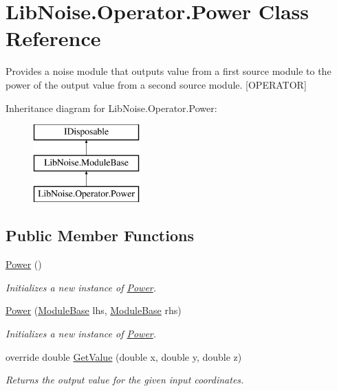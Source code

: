 \hypertarget{class_lib_noise_1_1_operator_1_1_power}{}\section{Lib\+Noise.\+Operator.\+Power Class Reference}
\label{class_lib_noise_1_1_operator_1_1_power}


Provides a noise module that outputs value from a first source module to the power of the output value from a second source module. \mbox{[}O\+P\+E\+R\+A\+T\+OR\mbox{]}  


Inheritance diagram for Lib\+Noise.\+Operator.\+Power\+:\begin{figure}[H]
\begin{center}
\leavevmode
\includegraphics[height=3.000000cm]{class_lib_noise_1_1_operator_1_1_power}
\end{center}
\end{figure}
\subsection*{Public Member Functions}
\begin{DoxyCompactItemize}
\item 
\hyperlink{class_lib_noise_1_1_operator_1_1_power_a7bd48c1282db7041bcefb4c3da91b439}{Power} ()
\begin{DoxyCompactList}\small\item\em Initializes a new instance of \hyperlink{class_lib_noise_1_1_operator_1_1_power}{Power}. \end{DoxyCompactList}\item 
\hyperlink{class_lib_noise_1_1_operator_1_1_power_aaefef1d576110d91791c827df6528473}{Power} (\hyperlink{class_lib_noise_1_1_module_base}{Module\+Base} lhs, \hyperlink{class_lib_noise_1_1_module_base}{Module\+Base} rhs)
\begin{DoxyCompactList}\small\item\em Initializes a new instance of \hyperlink{class_lib_noise_1_1_operator_1_1_power}{Power}. \end{DoxyCompactList}\item 
override double \hyperlink{class_lib_noise_1_1_operator_1_1_power_a307d65a6817388814f287d90e68ce6f4}{Get\+Value} (double x, double y, double z)
\begin{DoxyCompactList}\small\item\em Returns the output value for the given input coordinates. \end{DoxyCompactList}\end{DoxyCompactItemize}
